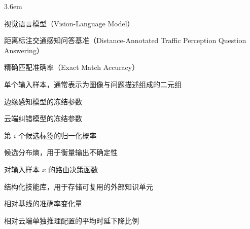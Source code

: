 
\begin{notation}

  \begin{notationlist}{3.6em}
    \item[VLM] 视觉语言模型（Vision-Language Model）
    \item[DTPQA] 距离标注交通感知问答基准（Distance-Annotated Traffic Perception Question Answering）
    \item[EM] 精确匹配准确率（Exact Match Accuracy）
    \item[$x$] 单个输入样本，通常表示为图像与问题描述组成的二元组
    \item[$\theta_e$] 边缘感知模型的冻结参数
    \item[$\theta_c$] 云端纠错模型的冻结参数
    \item[$p_i$] 第 $i$ 个候选标签的归一化概率
    \item[$H(p)$] 候选分布熵，用于衡量输出不确定性
    \item[$r(x)$] 对输入样本 $x$ 的路由决策函数
    \item[$\mathcal{S}$] 结构化技能库，用于存储可复用的外部知识单元
    \item[$\Delta_{\text{acc}}$] 相对基线的准确率变化量
    \item[$\Delta_{\text{lat}}$] 相对云端单独推理配置的平均时延下降比例
  \end{notationlist}

\end{notation}

